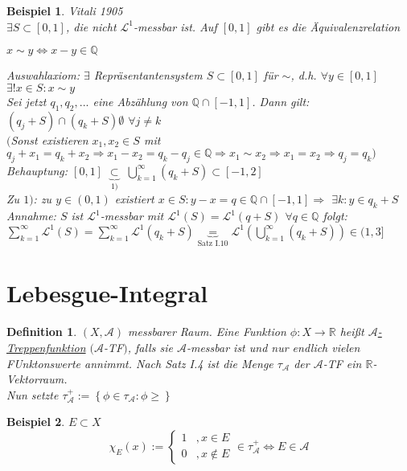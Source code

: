 \documentclass[11pt]{memoir}
\theoremstyle{changebreak}
\newtheorem{Definition}{Definition}[chapter]
\newtheorem{Beispiel}{Beispiel}[chapter]
\begin{document}
\begin{Beispiel}
\emph{Vitali 1905} \\
$\exists S \subset [0, 1]$, die nicht $\mathscr L^1$-messbar ist. Auf $[0, 1]$ gibt es die Äquivalenzrelation
\begin{center}
	$x \sim y \Leftrightarrow x - y \in \mathbb Q$
\end{center}
Auswahlaxiom: $\exists$ Repräsentantensystem $S \subset [0, 1]$ für $\sim$, d.h. $\forall y \in [0, 1]$ $\exists! x \in S: x \sim y$ \\
Sei jetzt $q_1, q_2, ...$ eine Abzählung von $\mathbb Q \cap [-1, 1]$. Dann gilt: $(q_j + S) \cap (q_k +S)  \emptyset $ $\forall j \ne k$ \\
$($Sonst existieren $x_1, x_2 \in S$ mit $q_j +x_1 = q_k + x_2 \Rightarrow x_1-x_2 = q_k -q_j \in \mathbb Q \Rightarrow x_1 \sim x_2  \Rightarrow x_1 = x_2 \Rightarrow q_j = q_k $\blitzd $ )$ \\

\emph{Behauptung:} $[0, 1]$ $\underbrace{\subset}_{1)}$ $\bigcup\limits_{k=1}^\infty
 (q_k + S) \subset [-1, 2]$ \\
 Zu $1)$: zu $y \in (0, 1)$ existiert $x \in S: y - x = q \in \mathbb Q \cap [-1, 1] \Rightarrow$ $\exists k: y \in q_k + S$ \\
\emph{Annahme:} $S$ ist $\mathscr L^1$-messbar mit $\mathscr L^1(S) = \mathscr L^1(q + S)$ $\forall q \in \mathbb Q$ folgt: $\sum\limits_{k=1}^\infty \mathscr L^1(S) = \sum\limits_{k=1}^\infty \mathscr L^1(q_k + S) \underbrace{=}_ {\text{Satz I.10}} \mathscr L^1\left(\bigcup\limits_{k=1}^\infty (q_k + S) \right) \in (1, 3]$ \blitzd
\end{Beispiel}


\section{Lebesgue-Integral}
\begin{Definition}
$(X, \mathscr A)$ messbarer Raum. Eine Funktion $\phi: X \rightarrow \mathbb R$ heißt \underline{$\mathscr A$-Treppenfunktion} $(\mathscr A$-TF$)$, falls sie $\mathscr A$-messbar ist und nur endlich vielen FUnktonswerte annimmt. Nach Satz I.4 ist die Menge $\tau_ \mathscr A$ der $\mathscr A$-TF ein $\mathbb R$-Vektorraum. \\
Nun setzte $\tau_\mathscr A^+ := \left\{\phi\in \tau_\mathscr A: \phi \geq\right\}$
\end{Definition}


\begin{Beispiel}
$E \subset X$ \\
\begin{equation}
	\chi_E (x) :=
	\begin{cases}
		1 &, x \in E \\
		0 & , x \notin E
	\end{cases}
	\in \tau_\mathscr A^+ \Leftrightarrow E \in \mathscr A
\end{equation}
\end{Beispiel}
\end{document}
